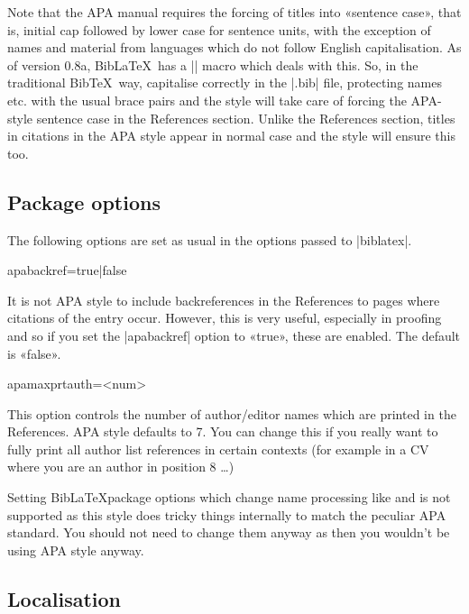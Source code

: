 \documentclass{ltxdockit}
\begin{document}
\noindent Note that the APA manual requires the forcing of titles into
«sentence case», that is, initial cap followed by lower case for sentence
units, with the exception of names and material from languages which do not
follow English capitalisation. As of version 0.8a, Bib\LaTeX\ has a
|\MakeSentenceCase| macro which deals with this. So, in the traditional
Bib\TeX\ way, capitalise correctly in the |.bib| file, protecting names etc.
with the usual brace pairs and the style will take care of forcing the
APA-style sentence case in the References section. Unlike the References
section, titles in citations in the APA style appear in normal case and the
style will ensure this too.

\subsection{Package options}\label{opts}

The following options are set as usual in the options passed to
|biblatex|.

\begin{ltxcode}
apabackref=true|false
\end{ltxcode}%

\noindent It is not APA style to include backreferences in the References to
pages where citations of the entry occur. However, this is very
useful, especially in proofing and so if you set the |apabackref|
option to «true», these are enabled. The default is «false».

\begin{ltxcode}
apamaxprtauth=<num>
\end{ltxcode}

\noindent This option controls the number of author/editor names which are
printed in the References. APA style defaults to 7. You can change this if
you really want to fully print all author list references in certain
contexts (for example in a CV where you are an author in position 8 \ldots)

Setting Bib\LaTeX package options which change name processing
like  and  is not supported as this style
does tricky things internally to match the peculiar APA standard. You
should not need to change them anyway as then you wouldn't be using APA
style anyway.

\subsection{Localisation}
\end{document}
